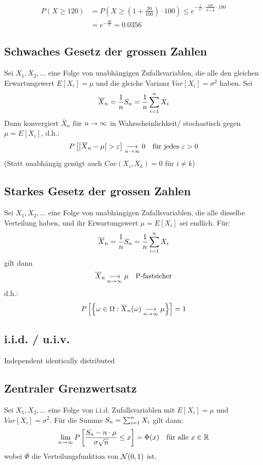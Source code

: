 \begin{align*}
  P(X \geq 120) &= P(X \geq (1 + \frac{20}{100}) \cdot 100) \leq e^{-\frac{1}{5^2} \cdot \frac{100}{2+\frac{1}{5}} \cdot 100} \\
                &= e^{-\frac{20}{6}} = 0.0356
\end{align*}

\BoxEnd{}
\subsection{Schwaches Gesetz der grossen Zahlen}
Sei $X_1, X_2, \dots$ eine Folge von unabhängigen Zufallsvariablen, die alle
den gleichen Erwartungswert $E[X_i] = \mu$ und die gleiche Varianz $Var[X_i] =
  \sigma^2$ haben. Sei
\begin{align*}
  \overline{X}_n = \frac{1}{n} S_n = \frac{1}{n} \sum_{i = 1}^n X_i
\end{align*}
Dann konvergiert $\overline{X}_n$ für $n \rightarrow \infty$ in Wahrscheinlichkeit/
stochastisch gegen $\mu = E[X_i]$, d.h.:
\begin{align*}
  P \left[ \abs{\overline{X}_n - \mu} > \varepsilon \right] \underset{n \rightarrow \infty}{\longrightarrow} 0
   &  & \text{für jedes } \varepsilon > 0
\end{align*}
(Statt unabhängig genügt auch $Cov (X_i, X_k) = 0$ für $i \neq k$)
\subsection{Starkes Gesetz der grossen Zahlen}
Sei $X_1, X_2, \dots$ eine Folge von unabhängigen Zufallsvariablen, die alle
dieselbe Verteilung haben, und ihr Erwartungswert $\mu = E[X_i]$ sei endlich.
Für:
\begin{align*}
  \overline{X}_n = \frac{1}{n} S_n = \frac{1}{n} \sum_{i = 1}^n X_i
\end{align*}
gilt dann
\begin{align*}
  \overline{X}_n \underset{n \rightarrow \infty}{\longrightarrow} \mu &  & \text{P-fastsicher}
\end{align*}
d.h.:
\begin{align*}
  P \left[ \left\{ \omega \in \Omega : \overline{X}_n (\omega) \underset{n \rightarrow \infty}{\longrightarrow} \mu \right\} \right] = 1
\end{align*}
\subsection{i.i.d. / u.i.v.}
Independent identically distributed
\subsection{Zentraler Grenzwertsatz}
Sei $X_1, X_2, \dots$ eine Folge von i.i.d. Zufallsvariablen mit $E[X_i] = \mu$
und $Var[X_i] = \sigma^2$. Für die Summe $S_n = \sum_{i = 1}^n X_i$ gilt dann:
\begin{align*}
  \lim_{n \rightarrow \infty} P \left[ \frac{S_n - n \cdot \mu}{\sigma \sqrt{n}} \leq x \right] = \Phi (x)
   &  & \text{für alle } x \in \mathbb{R}
\end{align*}
wobei $\Phi$ die Verteilungsfunktion von $\mathcal{N} (0, 1)$ ist.
